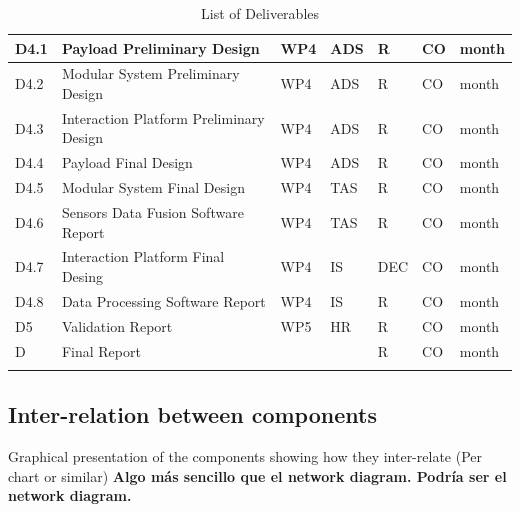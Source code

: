 \begin{longtable}[H]{p{1.8cm} p{2cm} p{1.3cm} p{1.8cm} p{1.3cm} p{2.1cm} p{1.8cm}}
	\midrule

 	D4.1 & Payload Preliminary Design  & WP4 & ADS & R & CO & month  \vspace{0.2cm} \\

 	\midrule

	D4.2 & Modular System Preliminary Design & WP4 & ADS & R & CO & month  \vspace{0.2cm} \\
	
	\midrule
	
	D4.3 & Interaction Platform Preliminary Design  & WP4 & ADS & R & CO & month  \vspace{0.2cm} \\

	\midrule

 	D4.4 & Payload Final Design & WP4 & ADS & R & CO & month  \vspace{0.2cm} \\

 	\midrule

	D4.5 & Modular System  Final Design & WP4 & TAS & R & CO & month  \vspace{0.2cm} \\
	
	\midrule
	
	D4.6 & Sensors Data Fusion Software Report  & WP4 & TAS & R & CO & month  \vspace{0.2cm} \\

	\midrule

 	D4.7 & Interaction Platform Final Desing  & WP4 & IS & DEC & CO & month  \vspace{0.2cm} \\

 	\midrule

	D4.8 & Data Processing Software Report & WP4 & IS & R & CO & month  \vspace{0.2cm} \\
	
	\midrule
	
	D5 & Validation Report & WP5 & HR & R & CO & month  \vspace{0.2cm} \\

	\midrule

 	D & Final Report &  &  & R & CO & month  \vspace{0.2cm} \\
	
	\bottomrule[2pt]
	
	\caption{List of Deliverables}
	\label{Deliverables}
\end{longtable}


\subsection{Inter-relation between components}

Graphical presentation of the components showing how they inter-relate (Per chart or similar) \textbf{Algo más sencillo que el network diagram. Podría ser el network diagram.}


